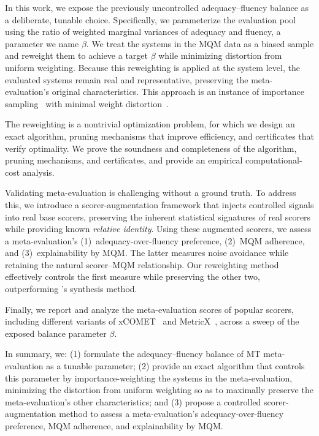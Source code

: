 \documentclass[11pt]{article}
\begin{document}
In this work, we expose the previously uncontrolled adequacy--fluency balance as a deliberate, tunable choice. Specifically, we parameterize the evaluation pool using the ratio of weighted marginal variances of adequacy and fluency, a parameter we name $\beta$. We treat the systems in the MQM data as a biased sample and reweight them to achieve a target $\beta$ while minimizing distortion from uniform weighting. Because this reweighting is applied at the system level, the evaluated systems remain real and representative, preserving the meta-evaluation's original characteristics. This approach is an instance of importance sampling~\citep{tokdar2010importance} with minimal weight distortion~\citep{deville-sarndal-1992}.

The reweighting is a nontrivial optimization problem, for which we design an exact algorithm, pruning mechanisms that improve efficiency, and certificates that verify optimality. We prove the soundness and completeness of the algorithm, pruning mechanisms, and certificates, and provide an empirical computational-cost analysis.

Validating meta-evaluation is challenging without a ground truth. To address this, we introduce a scorer-augmentation framework that injects controlled signals into real base scorers, preserving the inherent statistical signatures of real scorers while providing known \emph{relative identity}. Using these augmented scorers, we assess a meta-evaluation's (1)~adequacy-over-fluency preference, (2)~MQM adherence, and (3)~explainability by MQM. The latter measures noise avoidance while retaining the natural scorer--MQM relationship. Our reweighting method effectively controls the first measure while preserving the other two, outperforming \citet{shayegh-etal-2025-feeding}'s synthesis method.

Finally, we report and analyze the meta-evaluation scores of popular scorers, including different variants of xCOMET~\citep{10.1162/tacl_a_00683} and MetricX~\citep{juraska-etal-2024-metricx}, across a sweep of the exposed balance parameter $\beta$.

In summary, we: (1) formulate the adequacy--fluency balance of MT meta-evaluation as a tunable parameter; (2) provide an exact algorithm that controls this parameter by importance-weighting the systems in the meta-evaluation, minimizing the distortion from uniform weighting so as to maximally preserve the meta-evaluation's other characteristics; and
(3) propose a controlled scorer-augmentation method to assess a meta-evaluation's adequacy-over-fluency preference, MQM adherence, and explainability by MQM.
\end{document}
